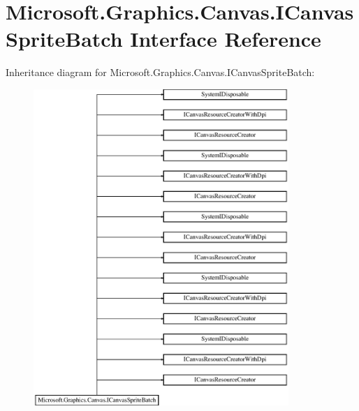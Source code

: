 \hypertarget{interface_microsoft_1_1_graphics_1_1_canvas_1_1_i_canvas_sprite_batch}{}\section{Microsoft.\+Graphics.\+Canvas.\+I\+Canvas\+Sprite\+Batch Interface Reference}
\label{interface_microsoft_1_1_graphics_1_1_canvas_1_1_i_canvas_sprite_batch}
Inheritance diagram for Microsoft.\+Graphics.\+Canvas.\+I\+Canvas\+Sprite\+Batch\+:\begin{figure}[H]
\begin{center}
\leavevmode
\includegraphics[height=12.000000cm]{interface_microsoft_1_1_graphics_1_1_canvas_1_1_i_canvas_sprite_batch}
\end{center}
\end{figure}
